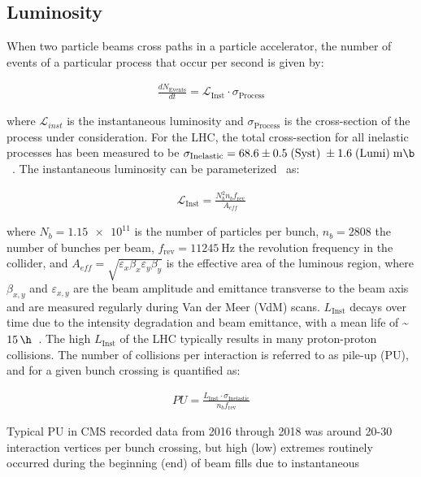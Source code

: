 \subsection{Luminosity}
When two particle beams cross paths in a particle accelerator, the number of events of a particular process that occur per second is given by:
\begin{linenomath*}
\begin{align}
{\frac{dN_{\text {Events}}}{dt}}= \mathcal{L}_{\text{Inst}} \cdot \sigma_{\text{Process}}
\end{align}
\end{linenomath*}
where $\mathcal{L}_{inst}$ is the instantaneous luminosity and $\sigma_{\text{Process}}$ is the cross-section of the process under consideration.
For the \beamenergy LHC, the total cross-section for all inelastic processes has been measured to be $\sigma_{\text{Inelastic}} = 68.6 \pm 0.5 \; (\text{Syst}) \; \pm 1.6 \; (\text{Lumi}) \; \si{\milli \b}$~\cite{inelasticprotonprotoncrosssection}.
The instantaneous luminosity can be parameterized~\cite{Karacheban:2294183} as:
\begin{linenomath*}
\begin{align}
\mathcal{L}_{\text{Inst}}=\frac{N_b^2 n_b f_{\mathrm{rev}}}{A_{eff}}
\end{align}
\end{linenomath*}
where $N_b = \num{1.15e11}$ is the number of particles per bunch, $n_b=2808$ the number of bunches per beam, $f_{\mathrm{rev}} = \SI{11245}{\Hz}$ the revolution frequency in the collider, and $A_{eff} = \sqrt{\varepsilon_x \beta_x \varepsilon_y \beta_y}$ is the effective area of the luminous region, where $\beta_{x,y}$ and $\varepsilon_{x,y}$ are the beam amplitude and emittance transverse to the beam axis and are measured regularly during Van der Meer (VdM) scans.
$L_{\text{Inst}}$ decays over time due to the intensity degradation and beam emittance, with a mean life of \sim$\SI{15}{\h}$~\cite{LyndonEvans_2008}.
The high $L_{\text{Inst}}$ of the LHC typically results in many proton-proton collisions.
The number of collisions per interaction is referred to as pile-up (PU), and for a given bunch crossing is quantified as:
\begin{linenomath*}
\begin{align}
PU = \frac{L_{\text{Inst}} \cdot \sigma_{\text{Inelastic}}}{n_b f_{\mathrm{rev}}}
\end{align}
\end{linenomath*}
Typical PU in CMS recorded data from 2016 through 2018 was around 20-30 interaction vertices per bunch crossing, but high (low) extremes routinely occurred during the beginning (end) of beam fills due to instantaneous 
